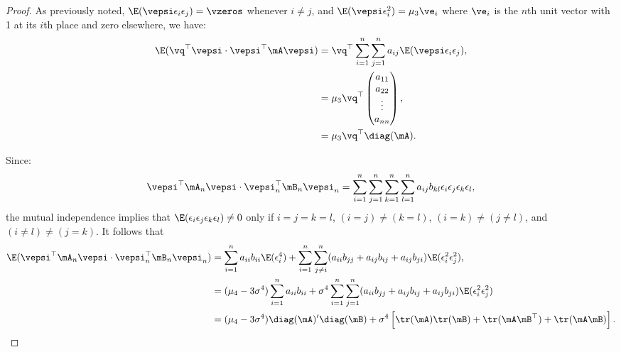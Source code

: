 \documentclass[english,12pt]{book}\usepackage[]{graphicx}\usepackage[]{xcolor}
\begin{document}
\begin{proof}
As previously noted, $\E(\vepsi \epsilon_{i}\epsilon_j) = \vzeros$ whenever $i\neq j$, and $\E(\vepsi\epsilon_i^2) = \mu_3\ve_i$ where $\ve_i$ is the $n$th unit vector with 1 at its $i$th place and zero elsewhere, we have:
\begin{equation*}
\begin{aligned}
 \E(\vq^\top\vepsi \cdot \vepsi^\top\mA\vepsi) & = \vq^\top\sum_{i = 1}^n\sum_{j = 1}^n a_{ij}\E(\vepsi\epsilon_i\epsilon_j), \\
 & = \mu_3\vq^\top\begin{pmatrix}
                   a_{11} \\
                   a_{22} \\
                   \vdots \\
                   a_{nn}
                   \end{pmatrix}, \\
  & =   \mu_3\vq^\top\diag(\mA).               
\end{aligned}
\end{equation*}

Since:
\begin{equation*}
  \vepsi^\top\mA_n\vepsi \cdot \vepsi_n^\top\mB_n\vepsi_n = \sum_{i=1}^n\sum_{j = 1}^n\sum_{k = 1}^n\sum_{l = 1}^n a_{ij}b_{kl}\epsilon_{i}\epsilon_j\epsilon_k\epsilon_l,
\end{equation*}
%
the mutual independence implies that $\E(\epsilon_{i}\epsilon_j\epsilon_k\epsilon_l)\neq 0$ only if $i = j = k = l$, $(i = j)\neq(k = l)$, $(i = k)\neq (j\neq l)$, and $(i\neq l)\neq (j =k)$. It follows that
\begin{equation*}
\begin{aligned}
\E(\vepsi^\top\mA_n\vepsi \cdot \vepsi_n^\top\mB_n\vepsi_n) & = \sum_{i = 1}^na_{ii}b_{ii}\E(\epsilon_i^4) + \sum_{i = 1}^n\sum_{j \neq i}^n(a_{ii}b_{jj} + a_{ij}b_{ij} + a_{ij}b_{ji})\E(\epsilon_i^2\epsilon_j^2),\\
& = (\mu_4 - 3\sigma^4)\sum_{i = 1}^na_{ii}b_{ii} + \sigma^4\sum_{i = 1}^n\sum_{j = 1}^n (a_{ii}b_{jj} + a_{ij}b_{ij} + a_{ij}b_{ji})\E(\epsilon_i^2\epsilon_j^2) \\
& = (\mu_4 - 3\sigma^4)\diag(\mA)'\diag(\mB) + \sigma^4\left[\tr(\mA)\tr(\mB) + \tr(\mA\mB^\top) + \tr(\mA\mB)\right].
\end{aligned}
\end{equation*}
\end{proof}

\end{document}
